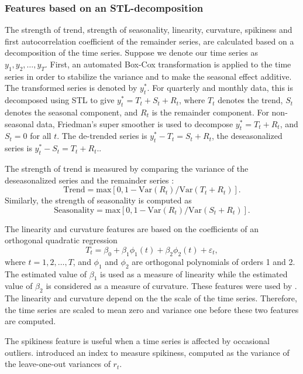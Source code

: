 \documentclass[11pt,a4paper,]{article}
\def\var{\text{Var}}
\begin{document}
\hypertarget{features-based-on-an-stl-decomposition}{%
\subsubsection*{Features based on an STL-decomposition}\label{features-based-on-an-stl-decomposition}}

The strength of trend, strength of seasonality, linearity, curvature, spikiness and first autocorrelation coefficient of the remainder series, are calculated based on a decomposition of the time series. Suppose we denote our time series as \(y_1, y_2, \dots,y_T\). First, an automated Box-Cox transformation \autocite{Guerrero1993} is applied to the time series in order to stabilize the variance and to make the seasonal effect additive. The transformed series is denoted by \(y_{t}^*\). For quarterly and monthly data, this is decomposed using STL \autocite{cleveland1990stl} to give \(y_t^*=T_t+S_t+R_t\), where \(T_t\) denotes the trend, \(S_t\) denotes the seasonal component, and \(R_t\) is the remainder component. For non-seasonal data, Friedman's super smoother \autocite{supsmu} is used to decompose \(y_t^*=T_t+R_t\), and \(S_t=0\) for all \(t\). The de-trended series is \(y_t^*-T_t=S_t+R_t\), the deseasonalized series is \(y_t^*-S_t = T_t+R_t\)..

The strength of trend is measured by comparing the variance of the deseasonalized series and the remainder series \autocite{wang2009rule}:
\[
    \text{Trend} = \text{max}\left[0, 1 - \var(R_{t})/\var(T_t+R_t)\right].
\]
Similarly, the strength of seasonality is computed as
\[
    \text{Seasonality} = \text{max}\left[0, 1- \var(R_{t})/ \var(S_t+R_t)\right].
\]

The linearity and curvature features are based on the coefficients of an orthogonal quadratic regression
\[
  T_t=\beta_0+\beta_1 \phi_1(t) + \beta_2\phi_2(t) + \varepsilon_t,
\]
where \(t=1, 2, \dots,T\), and \(\phi_1\) and \(\phi_2\) are orthogonal polynomials of orders 1 and 2. The estimated value of \(\beta_1\) is used as a measure of linearity while the estimated value of \(\beta_2\) is considered as a measure of curvature. These features were used by \textcite{hyndman2015large}. The linearity and curvature depend on the the scale of the time series. Therefore, the time series are scaled to mean zero and variance one before these two features are computed.

The spikiness feature is useful when a time series is affected by occasional outliers. \textcite{hyndman2015large} introduced an index to measure spikiness, computed as the variance of the leave-one-out variances of \(r_t\).
\end{document}
